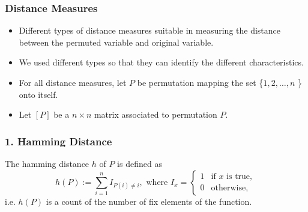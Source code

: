 \documentclass{beamer}
\begin{document}
\begin{frame}
\begin{columns}
		\begin{column}{0.52\textwidth}
		\begin{figure}
			 \begin{center}  
			 \end{center}
			 \end{figure}
		\end{column}

\end{columns}
\end{frame}

\begin{frame}
\frametitle{Distance Measures}
\begin{itemize}
\item Different types of distance measures suitable in measuring the distance between the permuted variable and original variable.
\item We used different types so that they can identify the different characteristics.
\item For all distance measures, let $P$ be permutation mapping the set \{$1, 2, \dots,n$ \} onto itself. 
\item Let $[P]$ be a $n \times n$ matrix associated to permutation $P$.
\end{itemize}
\end{frame}

\begin{frame}
\frametitle{1. Hamming Distance}

 The hamming distance $h$ of $P$ is defined as 
\[
h(P) := \sum_{i=1}^n I_{P(i) \neq i},  \text{ where } I_{x} = \left \{ 
\begin{array}{ll}
1 & \text{if } x \text{ is true},\\
0 & \text{otherwise},
\end{array} \right.
\]
i.e. $h(P)$ is a count of the number of fix elements of the function.


\end{frame}
\end{document}
